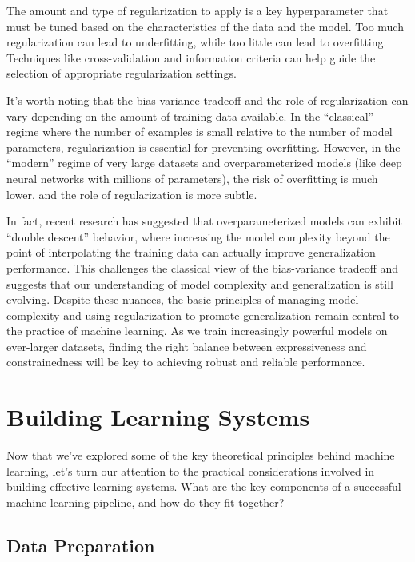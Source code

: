 \documentclass[
  9pt,
  letterpaper,
  abstract,
  titlepage]{scrbook}
\begin{document}
The amount and type of regularization to apply is a key hyperparameter
that must be tuned based on the characteristics of the data and the
model. Too much regularization can lead to underfitting, while too
little can lead to overfitting. Techniques like cross-validation and
information criteria can help guide the selection of appropriate
regularization settings.

It's worth noting that the bias-variance tradeoff and the role of
regularization can vary depending on the amount of training data
available. In the ``classical'' regime where the number of examples is
small relative to the number of model parameters, regularization is
essential for preventing overfitting. However, in the ``modern'' regime
of very large datasets and overparameterized models (like deep neural
networks with millions of parameters), the risk of overfitting is much
lower, and the role of regularization is more subtle.

In fact, recent research has suggested that overparameterized models can
exhibit ``double descent'' behavior, where increasing the model
complexity beyond the point of interpolating the training data can
actually improve generalization performance. This challenges the
classical view of the bias-variance tradeoff and suggests that our
understanding of model complexity and generalization is still evolving.
Despite these nuances, the basic principles of managing model complexity
and using regularization to promote generalization remain central to the
practice of machine learning. As we train increasingly powerful models
on ever-larger datasets, finding the right balance between
expressiveness and constrainedness will be key to achieving robust and
reliable performance.

\section{Building Learning Systems}\label{building-learning-systems}

Now that we've explored some of the key theoretical principles behind
machine learning, let's turn our attention to the practical
considerations involved in building effective learning systems. What are
the key components of a successful machine learning pipeline, and how do
they fit together?

\subsection{Data Preparation}\label{data-preparation}
\end{document}
